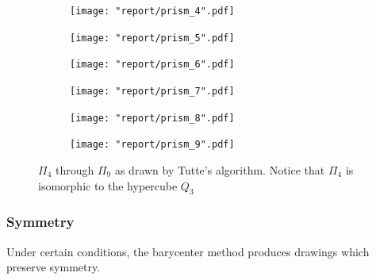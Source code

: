 \documentclass[11pt]{report}
\begin{document}
\begin{figure}[H]
    \centering
    
    \begin{subfigure}{.3\textwidth}
        \texttt{[image: "report/prism\_4".pdf]}
    \end{subfigure}
    \begin{subfigure}{.3\textwidth}
        \texttt{[image: "report/prism\_5".pdf]}
    \end{subfigure}
    \begin{subfigure}{.3\textwidth}
        \texttt{[image: "report/prism\_6".pdf]}
    \end{subfigure}

    \begin{subfigure}{.3\textwidth}
        \texttt{[image: "report/prism\_7".pdf]}
    \end{subfigure}
    \begin{subfigure}{.3\textwidth}
        \texttt{[image: "report/prism\_8".pdf]}
    \end{subfigure}
    \begin{subfigure}{.3\textwidth}
        \texttt{[image: "report/prism\_9".pdf]}
    \end{subfigure}
    \caption{$\Pi_4$ through $\Pi_{9}$ as drawn by Tutte's algorithm. Notice that $\Pi_4$ is isomorphic to the hypercube $Q_3$}
\end{figure}

\subsubsection{Symmetry}
Under certain conditions, the barycenter method produces drawings which preserve symmetry.
\end{document}
